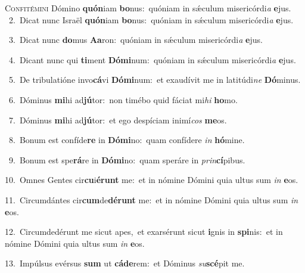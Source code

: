 \lettrine{\initial\textcolor{\initialcolor}{C}}{onfitémini} Dómino \textbf{quón}\-iam \textbf{bo}\-nus:~\star quóniam in sǽculum misericórdi\textit{a} \textbf{e}\-jus.\\
{\numbfont\textcolor{\numbcolor}{~2.}}~Dicat nunc Israël \textbf{quón}\-iam \textbf{bo}\-nus:~\star quóniam in sǽculum misericórdi\textit{a} \textbf{e}\-jus.\par
{\numbfont\textcolor{\numbcolor}{~3.}}~Dicat nunc \textbf{do}\-mus \textbf{A}\-\textbf{a}ron:~\star quóniam in sǽculum misericórdi\textit{a} \textbf{e}\-jus.\par
{\numbfont\textcolor{\numbcolor}{~4.}}~Dicant nunc qui \textbf{ti}\-ment \textbf{Dó}\-\textbf{mi}num:~\star quóniam in sǽculum misericórdi\textit{a} \textbf{e}\-jus.\par
{\numbfont\textcolor{\numbcolor}{~5.}}~De tribulatióne invo\-\textbf{cá}\-vi \textbf{Dó}\-\textbf{mi}num:~\star et exaudívit me in latitúdi\textit{ne} \textbf{Dó}\-minus.\par
{\numbfont\textcolor{\numbcolor}{~6.}}~Dóminus \textbf{mi}\-hi ad\-\textbf{jú}\-tor:~\star non timébo quid fáciat mi\textit{hi} \textbf{ho}\-mo.\par
{\numbfont\textcolor{\numbcolor}{~7.}}~Dóminus \textbf{mi}\-hi ad\-\textbf{jú}\-tor:~\star et ego despíciam inimí\textit{cos} \textbf{me}\-os.\par
{\numbfont\textcolor{\numbcolor}{~8.}}~Bonum est confíde\textbf{re} in \textbf{Dó}\-\textbf{mi}no:~\star quam confídere \textit{in} \textbf{hó}\-mine.\par
{\numbfont\textcolor{\numbcolor}{~9.}}~Bonum est spe\-\textbf{rá}\-re in \textbf{Dó}\-\textbf{mi}no:~\star quam speráre in \textit{prin}\-\textbf{cí}pibus.\par
{\numbfont\textcolor{\numbcolor}{10.}}~Omnes Gentes cir\-\textbf{cu}\-i\-\textbf{é}\-\textbf{runt} me:~\star et in nómine Dómini quia ultus sum \textit{in} \textbf{e}\-os.\par
{\numbfont\textcolor{\numbcolor}{11.}}~Circumdántes cir\-\textbf{cum}\-de\-\textbf{dé}\-\textbf{runt} me:~\star et in nómine Dómini quia ultus sum \textit{in} \textbf{e}\-os.\par
{\numbfont\textcolor{\numbcolor}{12.}}~Circumdedérunt me sicut apes,~\dagger et exarsérunt sicut \textbf{i}\-gnis in \textbf{spi}\-nis:~\star et in nómine Dómini quia ultus sum \textit{in} \textbf{e}\-os.\par
{\numbfont\textcolor{\numbcolor}{13.}}~Impúlsus evérsus \textbf{sum} ut \textbf{cá}\-\textbf{de}rem:~\star et Dóminus \textit{su}\-\textbf{scé}pit me.\par
